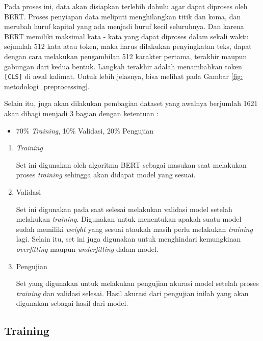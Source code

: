 Pada proses ini, data akan disiapkan terlebih dahulu agar dapat diproses oleh BERT. Proses penyiapan data meliputi menghilangkan titik dan koma, dan merubah huruf kapital yang ada menjadi huruf kecil seluruhnya. Dan karena BERT memiliki maksimal kata - kata yang dapat diproses dalam sekali waktu sejumlah 512 kata atau token, maka harus dilakukan penyingkatan teks, dapat dengan cara melakukan pengambilan 512 karakter pertama, terakhir maupun gabungan dari kedua bentuk. Langkah terakhir adalah menambahkan token \texttt{[CLS]} di awal kalimat. Untuk lebih jelasnya, bisa melihat pada Gambar \ref{fig: metodologi_preprocessing}.

Selain itu, juga akan dilakukan pembagian dataset yang awalnya berjumlah 1621 akan dibagi menjadi 3 bagian dengan ketentuan :

\begin{itemize}
    \item 70\% \textit{Training}, 10\% Validasi, 20\% Pengujian
\end{itemize}

\begin{enumerate}
    \item \textit{Training}

          Set ini digunakan oleh algoritma BERT sebagai masukan saat melakukan proses \textit{training} sehingga akan didapat model yang sesuai.

    \item Validasi

          Set ini digunakan pada saat selesai melakukan validasi model setelah melakukan \textit{training}. Digunakan untuk menentukan apakah suatu model sudah memiliki \textit{weight} yang sesuai ataukah masih perlu melakukan \textit{training} lagi. Selain itu, set ini juga digunakan untuk menghindari kemungkinan \textit{overfitting} maupun \textit{underfitting} dalam model.

    \item Pengujian

          Set yang digunakan untuk melakukan pengujian akurasi model setelah proses \textit{training} dan validasi selesai. Hasil akurasi dari pengujian inilah yang akan digunakan sebagai hasil dari model.

\end{enumerate}

\subsection{Training}

